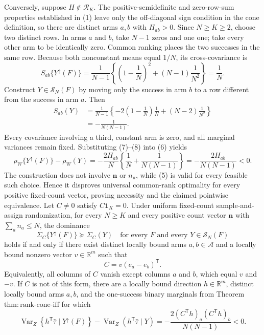 Conversely, suppose \(H\notin\mathcal R_K\).  The positive-semidefinite and zero-row-sum properties established in (1) leave only the off-diagonal sign condition in the cone definition, so there are distinct arms \(a,b\) with \(H_{ab}>0\).  Since \(N\geq K\geq2\), choose two distinct rows.  In arms \(a\) and \(b\), take \(N-1\) zeros and one one; take every other arm to be identically zero.  Common ranking places the two successes in the same row.  Because both nonconstant means equal \(1/N\), its cross-covariance is
\[
S_{ab}\{Y^{\uparrow}(F)\}
=\frac1{N-1}\left\{\left(1-\frac1N\right)^2
+(N-1)\frac1{N^2}\right\}=\frac1N. \tag{7}
\]
Construct \(Y\in\mathcal S_N(F)\) by moving only the success in arm \(b\) to a row different from the success in arm \(a\).  Then
\[
\begin{aligned}
S_{ab}(Y)
&=\frac1{N-1}\left\{-2\left(1-\frac1N\right)\frac1N
+(N-2)\frac1{N^2}\right\}\\
&=-\frac1{N(N-1)}. \tag{8}
\end{aligned}
\]
Every covariance involving a third, constant arm is zero, and all marginal variances remain fixed.  Substituting (7)--(8) into (6) yields
\[
\rho_W\{Y^{\uparrow}(F)\}-\rho_W(Y)
=-\frac{2H_{ab}}N\left\{\frac1N+\frac1{N(N-1)}\right\}
=-\frac{2H_{ab}}{N(N-1)}<0. \tag{9}
\]
The construction does not involve \(\mathbf n\) or \(n_{\mathrm u}\), while (5) is valid for every feasible such choice.  Hence it disproves universal common-rank optimality for every positive fixed-count vector, proving necessity and the claimed pointwise equivalence.
Let \(C\ne0\) satisfy \(C\mathbf 1_K=0\).  Under uniform fixed-count sample-and-assign randomization, for every \(N\geq K\) and every positive count vector \(\mathbf n\) with \(\sum_a n_a\leq N\), the dominance
\[
\Sigma_C\{Y^{\uparrow}(F)\}\succeq\Sigma_C(Y)
\quad\text{for every }F\text{ and every }Y\in\mathcal S_N(F)
\]
holds if and only if there exist distinct locally bound arms \(a,b\in\mathcal A\) and a locally bound nonzero vector \(v\in\mathbb R^m\) such that
\[
C=v(e_a-e_b)^{\mathsf T}.
\]
Equivalently, all columns of \(C\) vanish except columns \(a\) and \(b\), which equal \(v\) and \(-v\).  If \(C\) is not of this form, there are a locally bound direction \(h\in\mathbb R^m\), distinct locally bound arms \(a,b\), and the one-success binary marginals from Theorem \(\mathrm{thm{:}rank\text{-}cone\text{-}iff}\) for which
\[
\operatorname{Var}_Z\!\left\{h^{\mathsf T}\widehat\tau\mid Y^{\uparrow}(F)\right\}
-\operatorname{Var}_Z\!\left(h^{\mathsf T}\widehat\tau\mid Y\right)
=-\frac{2(C^{\mathsf T}h)_a(C^{\mathsf T}h)_b}{N(N-1)}<0.
\]
